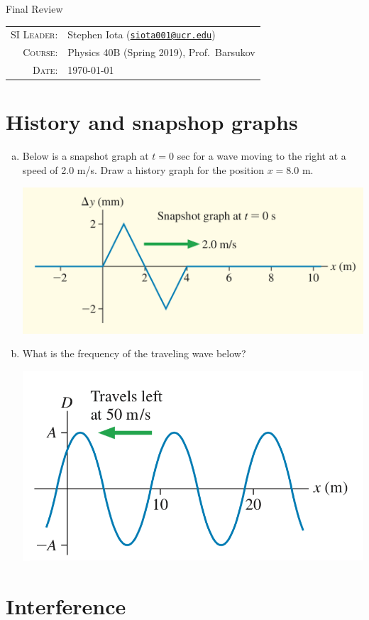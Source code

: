 \documentclass[12pt]{article}
\newcommand{\email}[1]{\texttt{\href{mailto:#1}{#1}}}
\begin{document}
\begin{center}
\Large{Final Review}
\end{center}
\vspace{.5mm}
\begin{tabular}{rl}
\textsc{SI Leader}:			& 			Stephen Iota (\email{siota001@ucr.edu})
\\
\textsc{Course}:				&			Physics 40B (Spring 2019), Prof.~Barsukov
\\
\textsc{Date}:					&			\today
\end{tabular}

\section{History and snapshop graphs}

\begin{enumerate}[(a)]
\item Below is a snapshot graph at $t = 0$ sec for a wave moving to the right at a speed of 2.0 m/s. Draw a history graph for the position $x = 8.0$ m.
\begin{center}
\includegraphics[width=.5\linewidth]{PSet4_FigA}
\end{center}

\item What is the frequency of the traveling wave below?
\begin{center}
\includegraphics[width=.5\linewidth]{PSet4_FigB}
\end{center}
\end{enumerate}

\newpage
\section{Interference}
\end{document}
